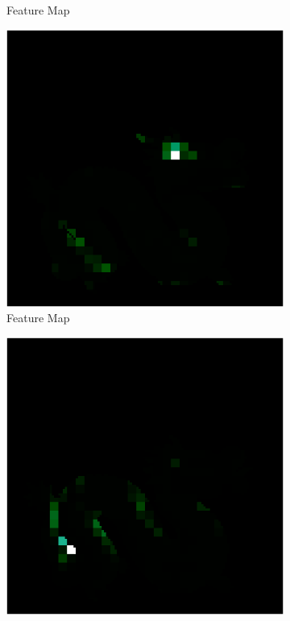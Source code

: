 \begin{figure}[H]
\begin{subfigure}[b]{0.19\linewidth}
		\caption{Feature Map}
	\end{subfigure}
	\begin{subfigure}[b]{0.19\linewidth}
		\includegraphics[width=\linewidth]{./Figures/feature_map_gcnn/feature_map_gcnn-gcnn_5.png}
		\caption{Feature Map}
	\end{subfigure}
	\begin{subfigure}[b]{0.19\linewidth}
		\includegraphics[width=\linewidth]{./Figures/feature_map_gcnn/feature_map_gcnn-gcnn_15.png}

\end{subfigure}
\end{figure}
